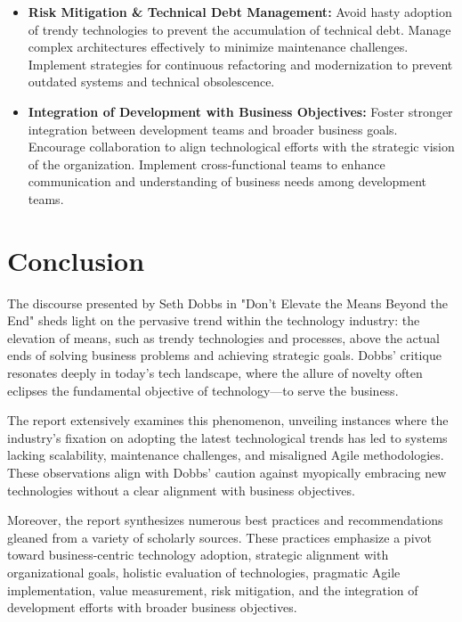 \documentclass[a4Paper]{article}
\begin{document}
\begin{itemize}
    \item \textbf{Risk Mitigation \& Technical Debt Management:} \cite{anzoategui2019endogenous, parthasarthy2018impact} Avoid hasty adoption of trendy technologies to prevent the accumulation of technical debt. Manage complex architectures effectively to minimize maintenance challenges. Implement strategies for continuous refactoring and modernization to prevent outdated systems and technical obsolescence.
    
    \item \textbf{Integration of Development with Business Objectives:} \cite{rahimi2016business, sjodin2020agile} Foster stronger integration between development teams and broader business goals. Encourage collaboration to align technological efforts with the strategic vision of the organization. Implement cross-functional teams to enhance communication and understanding of business needs among development teams.
\end{itemize}

\pagebreak

\section{Conclusion}
The discourse presented by Seth Dobbs in "Don't Elevate the Means Beyond the End" sheds light on the pervasive trend within the technology industry: the elevation of means, such as trendy technologies and processes, above the actual ends of solving business problems and achieving strategic goals. Dobbs' critique resonates deeply in today's tech landscape, where the allure of novelty often eclipses the fundamental objective of technology—to serve the business.

The report extensively examines this phenomenon, unveiling instances where the industry's fixation on adopting the latest technological trends has led to systems lacking scalability, maintenance challenges, and misaligned Agile methodologies. These observations align with Dobbs' caution against myopically embracing new technologies without a clear alignment with business objectives.

Moreover, the report synthesizes numerous best practices and recommendations gleaned from a variety of scholarly sources. These practices emphasize a pivot toward business-centric technology adoption, strategic alignment with organizational goals, holistic evaluation of technologies, pragmatic Agile implementation, value measurement, risk mitigation, and the integration of development efforts with broader business objectives.
\end{document}
